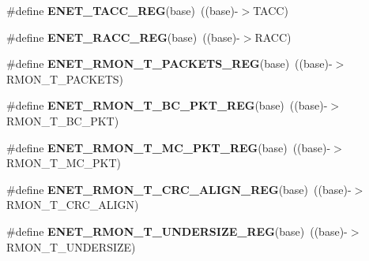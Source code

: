\begin{DoxyCompactItemize}
\item 
\#define {\bfseries E\+N\+E\+T\+\_\+\+T\+A\+C\+C\+\_\+\+R\+EG}(base)~((base)-\/$>$T\+A\+CC)\hypertarget{group__ENET__Register__Accessor__Macros_ga8b3a63d8c694e73965419d50f822d4c7}{}\label{group__ENET__Register__Accessor__Macros_ga8b3a63d8c694e73965419d50f822d4c7}

\item 
\#define {\bfseries E\+N\+E\+T\+\_\+\+R\+A\+C\+C\+\_\+\+R\+EG}(base)~((base)-\/$>$R\+A\+CC)\hypertarget{group__ENET__Register__Accessor__Macros_ga89065ddb1bbd3913967f7fe780b68dcf}{}\label{group__ENET__Register__Accessor__Macros_ga89065ddb1bbd3913967f7fe780b68dcf}

\item 
\#define {\bfseries E\+N\+E\+T\+\_\+\+R\+M\+O\+N\+\_\+\+T\+\_\+\+P\+A\+C\+K\+E\+T\+S\+\_\+\+R\+EG}(base)~((base)-\/$>$R\+M\+O\+N\+\_\+\+T\+\_\+\+P\+A\+C\+K\+E\+TS)\hypertarget{group__ENET__Register__Accessor__Macros_gad445fc7ab0df9cd42120401bfb225eed}{}\label{group__ENET__Register__Accessor__Macros_gad445fc7ab0df9cd42120401bfb225eed}

\item 
\#define {\bfseries E\+N\+E\+T\+\_\+\+R\+M\+O\+N\+\_\+\+T\+\_\+\+B\+C\+\_\+\+P\+K\+T\+\_\+\+R\+EG}(base)~((base)-\/$>$R\+M\+O\+N\+\_\+\+T\+\_\+\+B\+C\+\_\+\+P\+KT)\hypertarget{group__ENET__Register__Accessor__Macros_ga4ff6d714ea52f88a296d1ba2fc93d84e}{}\label{group__ENET__Register__Accessor__Macros_ga4ff6d714ea52f88a296d1ba2fc93d84e}

\item 
\#define {\bfseries E\+N\+E\+T\+\_\+\+R\+M\+O\+N\+\_\+\+T\+\_\+\+M\+C\+\_\+\+P\+K\+T\+\_\+\+R\+EG}(base)~((base)-\/$>$R\+M\+O\+N\+\_\+\+T\+\_\+\+M\+C\+\_\+\+P\+KT)\hypertarget{group__ENET__Register__Accessor__Macros_gaf132ce38561efee8dd7ec4aaf527ddbd}{}\label{group__ENET__Register__Accessor__Macros_gaf132ce38561efee8dd7ec4aaf527ddbd}

\item 
\#define {\bfseries E\+N\+E\+T\+\_\+\+R\+M\+O\+N\+\_\+\+T\+\_\+\+C\+R\+C\+\_\+\+A\+L\+I\+G\+N\+\_\+\+R\+EG}(base)~((base)-\/$>$R\+M\+O\+N\+\_\+\+T\+\_\+\+C\+R\+C\+\_\+\+A\+L\+I\+GN)\hypertarget{group__ENET__Register__Accessor__Macros_ga2521a041515bcce7cd92afa6fd939b00}{}\label{group__ENET__Register__Accessor__Macros_ga2521a041515bcce7cd92afa6fd939b00}

\item 
\#define {\bfseries E\+N\+E\+T\+\_\+\+R\+M\+O\+N\+\_\+\+T\+\_\+\+U\+N\+D\+E\+R\+S\+I\+Z\+E\+\_\+\+R\+EG}(base)~((base)-\/$>$R\+M\+O\+N\+\_\+\+T\+\_\+\+U\+N\+D\+E\+R\+S\+I\+ZE)\hypertarget{group__ENET__Register__Accessor__Macros_ga61e2c617f8818e7842fea7ac621cdc48}{}\label{group__ENET__Register__Accessor__Macros_ga61e2c617f8818e7842fea7ac621cdc48}


\end{DoxyCompactItemize}
